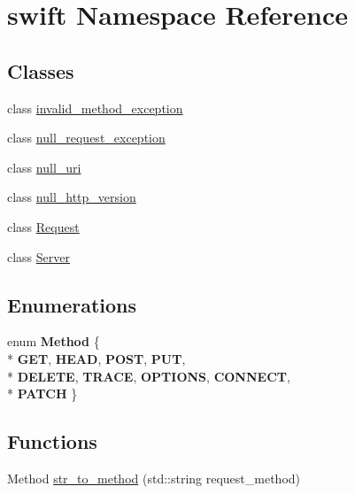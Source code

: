 \hypertarget{namespaceswift}{\section{swift Namespace Reference}
\label{namespaceswift}
}
\subsection*{Classes}
\begin{DoxyCompactItemize}
\item 
class \hyperlink{classswift_1_1invalid__method__exception}{invalid\-\_\-method\-\_\-exception}
\item 
class \hyperlink{classswift_1_1null__request__exception}{null\-\_\-request\-\_\-exception}
\item 
class \hyperlink{classswift_1_1null__uri}{null\-\_\-uri}
\item 
class \hyperlink{classswift_1_1null__http__version}{null\-\_\-http\-\_\-version}
\item 
class \hyperlink{classswift_1_1_request}{Request}
\item 
class \hyperlink{classswift_1_1_server}{Server}
\end{DoxyCompactItemize}
\subsection*{Enumerations}
\begin{DoxyCompactItemize}
\item 
enum {\bfseries Method} \{ \\*
{\bfseries G\-E\-T}, 
{\bfseries H\-E\-A\-D}, 
{\bfseries P\-O\-S\-T}, 
{\bfseries P\-U\-T}, 
\\*
{\bfseries D\-E\-L\-E\-T\-E}, 
{\bfseries T\-R\-A\-C\-E}, 
{\bfseries O\-P\-T\-I\-O\-N\-S}, 
{\bfseries C\-O\-N\-N\-E\-C\-T}, 
\\*
{\bfseries P\-A\-T\-C\-H}
 \}
\end{DoxyCompactItemize}
\subsection*{Functions}
\begin{DoxyCompactItemize}
\item 
Method \hyperlink{namespaceswift_a54d9cafe8eb822e4a2fedef9d724a702}{str\-\_\-to\-\_\-method} (std\-::string request\-\_\-method)
\end{DoxyCompactItemize}
